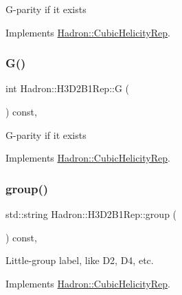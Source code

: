 G-\/parity if it exists 

Implements \mbox{\hyperlink{structHadron_1_1CubicHelicityRep_a50689f42be1e6170aa8cf6ad0597018b}{Hadron\+::\+Cubic\+Helicity\+Rep}}.

\mbox{\label{structHadron_1_1H3D2B1Rep_a7870acf492c1acb514530f17633f7f6d}} 
\subsubsection{\texorpdfstring{G()}{G()}\hspace{0.1cm}{\footnotesize\ttfamily [2/2]}}
{\footnotesize\ttfamily int Hadron\+::\+H3\+D2\+B1\+Rep\+::G (\begin{DoxyParamCaption}{ }\end{DoxyParamCaption}) const\hspace{0.3cm}{\ttfamily [inline]}, {\ttfamily [virtual]}}

G-\/parity if it exists 

Implements \mbox{\hyperlink{structHadron_1_1CubicHelicityRep_a50689f42be1e6170aa8cf6ad0597018b}{Hadron\+::\+Cubic\+Helicity\+Rep}}.

\mbox{\label{structHadron_1_1H3D2B1Rep_a6fa498fcad9f73335cba8e82709d663d}} 
\subsubsection{\texorpdfstring{group()}{group()}\hspace{0.1cm}{\footnotesize\ttfamily [1/3]}}
{\footnotesize\ttfamily std\+::string Hadron\+::\+H3\+D2\+B1\+Rep\+::group (\begin{DoxyParamCaption}{ }\end{DoxyParamCaption}) const\hspace{0.3cm}{\ttfamily [inline]}, {\ttfamily [virtual]}}

Little-\/group label, like D2, D4, etc. 

Implements \mbox{\hyperlink{structHadron_1_1CubicHelicityRep_a101a7d76cd8ccdad0f272db44b766113}{Hadron\+::\+Cubic\+Helicity\+Rep}}.

\mbox{\label{structHadron_1_1H3D2B1Rep_a6fa498fcad9f73335cba8e82709d663d}} 
